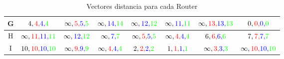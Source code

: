 \documentclass[a4paper,10pt]{article}
\begin{document}
\begin{table}[H]
\begin{tabular}{|c|c|c|c|c|c|c|c|}
G & $4,{\color{red}4,}{\color{blue}4,}{\color{green}4} $ & $\infty,{\color{red}5,}{\color{blue}5,}{\color{green}5} $ & $\infty,{\color{blue}14,}{\color{green}14} $ & $\infty,{\color{blue}12,}{\color{green}12} $ & $\infty,{\color{blue}11,}{\color{green}11} $ & $\infty,{\color{red}13,}{\color{blue}13,}{\color{green}13} $ & $0,{\color{red}0,}{\color{blue}0,}{\color{green}0} $ \\\hline
H & $ \infty,{\color{red}11,}{\color{blue}11,}{\color{green}11}$ & $\infty,{\color{blue}12,}{\color{green}12} $ & $ \infty,{\color{blue}7,}{\color{green}7}$ & $\infty,{\color{red}5,}{\color{blue}5,}{\color{green}5} $ & $ \infty,{\color{red}4,}{\color{blue}4,}{\color{green}4}$ & $6,{\color{red}6,}{\color{blue}6,}{\color{green}6} $ & $7,{\color{red}7,}{\color{blue}7,}{\color{green}7} $ \\\hline
I & $10,{\color{red}10,}{\color{blue}10,}{\color{green}10} $ & $\infty,{\color{red}9,}{\color{blue}9,}{\color{green}9} $ & $\infty,{\color{red}4,}{\color{blue}4,}{\color{green}4} $ & $2,{\color{red}2,}{\color{blue}2,}{\color{green}2} $ & $1,{\color{red}1,}{\color{blue}1,}{\color{green}1} $ & $ \infty,{\color{red}3,}{\color{blue}3,}{\color{green}3}$ & $\infty,{\color{red}10,}{\color{blue}10,}{\color{green}10} $ \\\hline
\end{tabular}
\caption{Vectores distancia para cada Router}
\end{table} \\
\end{document}

